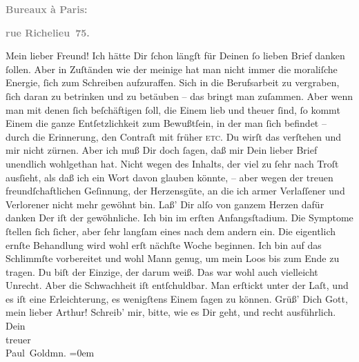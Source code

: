 \begin{ledgroupsized}[t]{13cm}
           \pstart
           \begin{otherlanguage}{french}\textcolor{gray}{\textbf{\textbf{Bureaux à Paris:}}}\end{otherlanguage}\pend
           \pstart
           \begin{otherlanguage}{french}\textcolor{gray}{\textbf{\textbf{rue Richelieu 75.}}}\end{otherlanguage}\pend
           \pstart\center{}Mein lieber Freund!\pend\pstart
           Ich hätte Dir ſchon längſt für Deinen ſo lieben Brief danken ſollen. Aber in
               Zuſtänden wie der meinige hat man nicht immer die moraliſche Energie, ſich zum
               Schreiben aufzuraffen. Sich in die Berufsarbeit zu vergraben, ſich daran zu betrinken
               und zu betäuben – das bringt man zuſammen. Aber wenn man mit denen ſich beſchäftigen
               ſoll, die Einem lieb und theuer ſind, ſo kommt Einem die ganze Entſetzlichkeit zum
               Bewußtſein, in der man ſich befindet – durch die Erin{\pb}nerung, den Contraſt mit früher \textsc{etc}. Du wirſt das
               verſtehen und mir nicht zürnen.\pend
           \pstart
           Aber ich muß Dir doch ſagen, daß mir Dein lieber Brief unendlich wohlgethan hat.
               Nicht wegen des Inhalts, der viel zu ſehr nach Troſt ausſieht, als daß ich ein Wort
               davon glauben könnte, – aber wegen der treuen freundſchaftlichen Geſinnung, der
               Herzensgüte, an die ich armer Verlaſſener und Verlorener nicht mehr gewöhnt bin. Laß’
               Dir alſo von ganzem Herzen dafür danken{\dotsfour}\pend
           \pstart
           Der \label{K_L02705-1v}\label{K_L02705-1h} iſt der gewöhnliche. Ich bin im erſten Anfangsſtadium. Die Symptome ſtellen
               ſich ſicher, aber ſehr langſam eines nach dem {\pb}andern ein. Die eigentlich ernſte Behandlung wird wohl erſt nächſte Woche beginnen.
               Ich bin auf das Schlimmſte vorbereitet und wohl Mann genug, um mein Loos bis zum Ende
               zu tragen.\pend
           \pstart
           Du biſt der Einzige, der darum weiß. Das war wohl auch vielleicht Unrecht. Aber die
               Schwachheit iſt entſchuldbar. Man erſtickt unter der Laſt, und es iſt eine
               Erleichterung, es wenigſtens Einem ſagen zu können.\pend
           \pstart
           Grüß’ Dich Gott, mein lieber Arthur! Schreib’ mir, bitte, wie es Dir geht, und recht
               ausführlich.\pend
           \pstart
           Dein {\\[\baselineskip]}treuer {\\[\baselineskip]}\spacefill\mbox{Paul Goldmn.}\pend
           \leftskip=0em{}
         
         \endnumbering{}\end{ledgroupsized}  \newcommand{\dateiname}{L02705}\newcommand{\titel}{Paul Goldmann an Arthur Schnitzler, 25. 2. [1893]}\newcommand{\editorInnen}{Martin Anton Müller und Laura Untner}
      